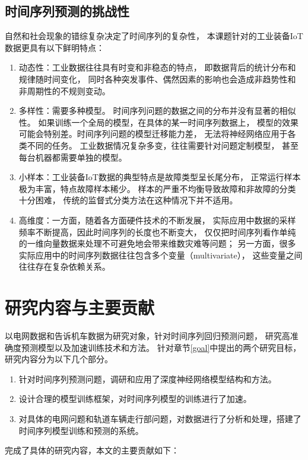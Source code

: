   \subsection{时间序列预测的挑战性}
    自然和社会现象的错综复杂决定了时间序列的复杂性，
    本课题针对的工业装备IoT数据更具有以下鲜明特点：
    \begin{enumerate}[(1)]
      \item 动态性：工业数据往往具有时变和非稳态的特点，
      即数据背后的统计分布和规律随时间变化，
      同时各种突发事件、偶然因素的影响也会造成非趋势性和非周期性的不规则变动。
      \item 多样性：需要多种模型。
      时间序列问题的数据之间的分布并没有显著的相似性。
      如果训练一个全局的模型，在具体的某一时间序列数据上，
      模型的效果可能会特别差。时间序列问题的模型迁移能力差，
      无法将神经网络应用于各类不同的任务。
      工业数据情况复杂多变，往往需要针对问题定制模型，
      甚至每台机器都需要单独的模型。
      \item 小样本：工业装备IoT数据的典型特点是故障类型呈长尾分布，
      正常运行样本极为丰富，特点故障样本稀少。
      样本的严重不均衡导致故障和非故障的分类十分困难，
      传统的监督式分类方法在这种情况下并不适用。
      \item 高维度：一方面，随着各方面硬件技术的不断发展，
      实际应用中数据的采样频率不断提高，因此时间序列的长度也不断变大，
      仅仅把时间序列看作单纯的一维向量数据来处理不可避免地会带来维数灾难等问题；
      另一方面，很多实际应用中的时间序列数据往往包含多个变量（multivariate），
      这些变量之间往往存在复杂依赖关系。
    \end{enumerate}

\section{研究内容与主要贡献}
以电网数据和告诉机车数据为研究对象，针对时间序列回归预测问题，
研究高准确度预测模型以及加速训练技术和方法。
针对章节\ref{goal}中提出的两个研究目标，研究内容分为以下几个部分。
\begin{enumerate}[(1)]
  \item 针对时间序列预测问题，调研和应用了深度神经网络模型结构和方法。
  \item 设计合理的模型训练框架，对时间序列模型的训练进行了加速。
  \item 对具体的电网问题和轨道车辆走行部问题，对数据进行了分析和处理，搭建了时间序列模型训练和预测的系统。
\end{enumerate}

完成了具体的研究内容，本文的主要贡献如下：

